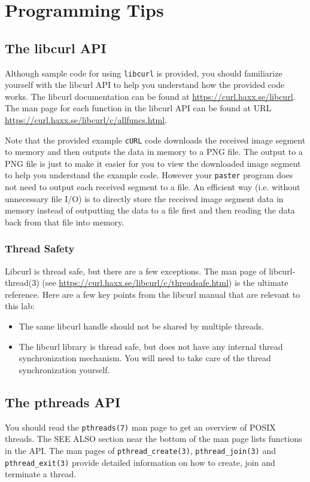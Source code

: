 \section{Programming Tips}
\label{sec:code-walk-through}

\subsection{The libcurl API}
Although sample code for using \verb+libcurl+ is provided, you should familiarize yourself with the libcurl API to help you understand how the provided code works. The libcurl documentation can be found at \url{https://curl.haxx.se/libcurl}. The man page for each function in the libcurl API can be found at URL \url{https://curl.haxx.se/libcurl/c/allfuncs.html}.

Note that the provided example \verb+cURL+ code downloads the received image segment to memory and then outputs the data in memory to a PNG file. The output to a PNG file is just to make it easier for you to view the downloaded image segment to help you understand the example code. However your \verb+paster+ program does not need to output each received segment to a file. An efficient way (i.e. without unnecessary file I/O) is to directly store the received image segment data in memory instead of outputting the data to a file first and then reading the data back from that file into memory. 


\subsubsection{Thread Safety}
\label{sec:libcurl-thread-safety}

Libcurl is thread safe, but there are a few exceptions. The man page of libcurl-thread(3) (see \url{https://curl.haxx.se/libcurl/c/threadsafe.html}) is the ultimate reference. Here are a few key points from the libcurl manual that are relevant to this lab:
\begin{itemize}
\item The same libcurl handle should not be shared by multiple threads. 
\item The libcurl library is thread safe, but does not have any internal thread synchronization mechanism. You will need to take care of the thread synchronization yourself.
\end{itemize}


\subsection{The pthreads API}
\label{sec:pthreads}
You should read the \verb+pthreads(7)+ man page to get an overview of POSIX threads. The SEE ALSO section near the bottom of the man page lists functions in the API. The man pages of \verb+pthread_create(3)+, \verb+pthread_join(3)+ and \verb+pthread_exit(3)+ provide detailed information on how to create, join and terminate a thread.

